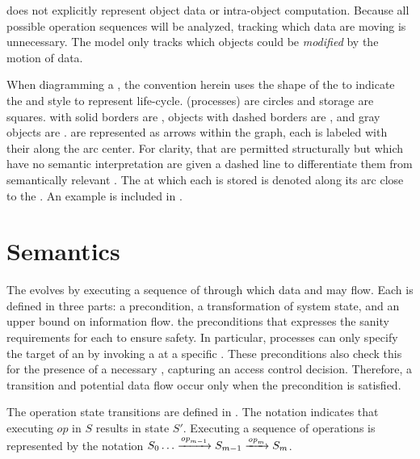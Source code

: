 \TMmodelName{} does not explicitly represent object data or intra-object computation.
Because all possible operation sequences will be analyzed, tracking which data are moving is unnecessary.
The model only tracks which objects could be \emph{modified} by the motion of data.

When diagramming a \TMsystemState{}, the convention herein uses the shape of the \TMobj{} to indicate the \TMobjsType{} and style to represent life-cycle.
\xmakefirstuc{\TMactive{}} \TMobjs{} (processes) are circles and \TMpassive{} storage \TMobjs{} are squares.
\xmakefirstuc{\TMobjs{}} with solid borders are \NMalive{}, objects with dashed borders are \NMunborn{}, and gray objects are \NMdead{}.
\xmakefirstuc{\TMcaps{}} are represented as arrows within the graph, each \TMcap{} is labeled with their \TMaccessRightSet{} along the arc center.
For clarity, \TMcaps{} that are permitted structurally but which have no semantic interpretation are given a dashed line to differentiate them from semantically relevant \TMcaps{}.
The \TMidx{} at which each \TMcap{} is stored is denoted along its arc close to the \TMobj{}.
An example is included in .

\section{Semantics}
\label{sect:sketch:semantics}

The \TMsystemState{} evolves by executing a sequence of \term{\TMops{}} through which data and \TMcaps{} may flow.
Each \term{\TMop} is defined in three parts: a precondition, a transformation of system state, and an upper bound on information flow.
 the preconditions that expresses the sanity requirements for each \TMop{} to ensure safety.
In particular, processes can only specify the target of an \TMop{} by invoking a \TMcap{} at a specific \TMidx{}.
These preconditions also check this \TMcap{} for the presence of a necessary \TMaccessRight{}, capturing an access control decision.
Therefore, a \TMsystemState{} transition and potential data flow occur only when the precondition is satisfied.

The operation state transitions are defined in .
The notation  indicates that executing \(op\) in \TMsystemState{} \(S\) results in state \(S'\).
Executing a sequence of operations is represented by the notation \(S_0 \dots \xrightarrow {\textit{op}_{m-1}} S_{m-1} \xrightarrow {\textit{op}_m} S_m\).

